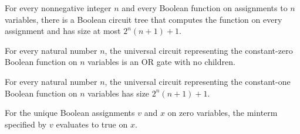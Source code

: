 \begin{theorem}
\label{BoolCircuit.exists_circuit_eval_eq_size_le}
\leanok
{}
For every nonnegative integer $n$ and every Boolean function on assignments to $n$
variables, there is a Boolean circuit tree that computes the function on every
assignment and has size at most $2^n(n+1)+1$.
\end{theorem}

\begin{theorem}
\label{BoolCircuit.universalCircuit_const_false}
\leanok
{}
For every natural number $n$, the universal circuit representing the constant-zero
Boolean function on $n$ variables is an OR gate with no children.
\end{theorem}

\begin{theorem}
\label{BoolCircuit.universalCircuit_const_true_size}
\leanok
{}
For every natural number $n$, the universal circuit representing the constant-one
Boolean function on $n$ variables has size $2^n(n+1)+1$.
\end{theorem}

\begin{theorem}
\label{BoolCircuit.minterm_eval_zero}
\leanok
{}
For the unique Boolean assignments $v$ and $x$ on zero variables, the minterm specified
by $v$ evaluates to true on $x$.
\end{theorem}
